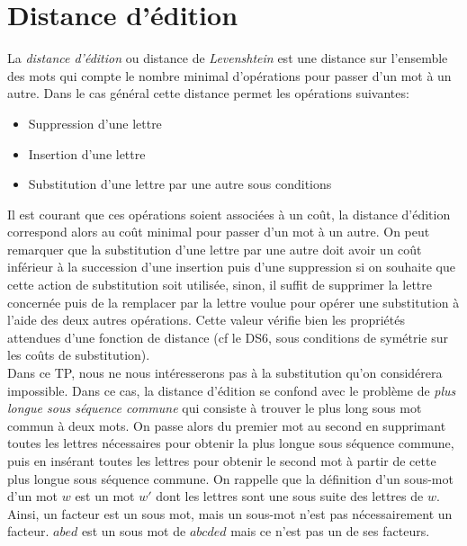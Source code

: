 \documentclass[a4paper, 10pt]{article}
\begin{document}
\section{Distance d'édition}
La \emph{distance d'édition} ou distance de \emph{Levenshtein} est une distance sur l'ensemble des mots qui compte le nombre minimal d'opérations pour passer d'un mot à un autre. Dans le cas général cette distance permet les opérations suivantes:
\begin{itemize}
\item Suppression d'une lettre
\item Insertion d'une lettre
\item Substitution d'une lettre par une autre sous conditions
\end{itemize}
Il est courant que ces opérations soient associées à un coût, la distance d'édition correspond alors au coût minimal pour passer d'un mot à un autre. On peut remarquer que la substitution d'une lettre par une autre doit avoir un coût inférieur à la succession d'une insertion puis d'une suppression si on souhaite que cette action de substitution soit utilisée, sinon, il suffit de supprimer la lettre concernée puis de la remplacer par la lettre voulue pour opérer une substitution à l'aide des deux autres opérations.
Cette valeur vérifie bien les propriétés attendues d'une fonction de distance (cf le DS6, sous conditions de symétrie sur les coûts de substitution).\\
Dans ce TP, nous ne nous intéresserons pas à la substitution qu'on considérera impossible. Dans ce cas, la distance d'édition se confond avec le problème de \emph{plus longue sous séquence commune} qui consiste à trouver le plus long sous mot commun à deux mots. On passe alors du premier mot au second en supprimant toutes les lettres nécessaires pour obtenir la plus longue sous séquence commune, puis en insérant toutes les lettres pour obtenir le second mot à partir de cette plus longue sous séquence commune.
On rappelle que la définition d'un sous-mot d'un mot \(w\) est un mot \(w'\) dont les lettres sont une sous suite des lettres de \(w\). Ainsi, un facteur est un sous mot, mais un sous-mot n'est pas nécessairement un facteur. \(abed\) est un sous mot de \(abcded\) mais ce n'est pas un de ses facteurs.
\end{document}

